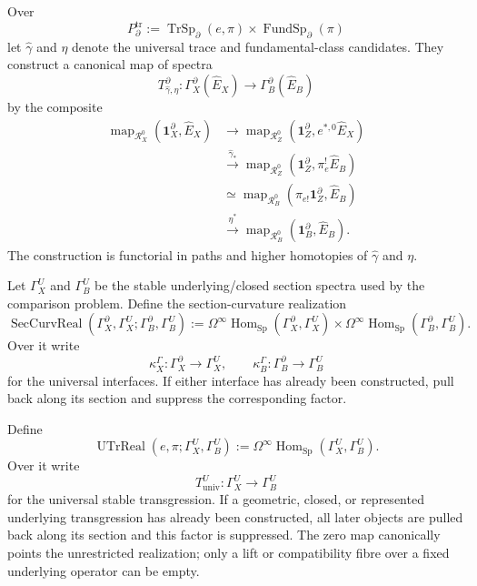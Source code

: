 \begin{construction}
\label{constr:prequantum-differential-transgression-operator}
Over
\[
P_{\partial}^{\mathrm{tr}}
:=
\operatorname{TrSp}_{\partial}(e,\pi)
\times
\operatorname{FundSp}_{\partial}(\pi)
\]
let $\widehat\gamma$ and $\eta$ denote the universal trace and
fundamental-class candidates.
They construct a canonical map of spectra
\[
\boxed{
T^{\partial}_{\widehat\gamma,\eta}:
\Gamma_X^{\partial}(\widehat E_X)
\longrightarrow
\Gamma_B^{\partial}(\widehat E_B)
}
\]
by the composite
\[
\begin{aligned}
\operatorname{map}_{\mathcal R_X^0}
(\mathbf1_X^{\partial},\widehat E_X)
&\longrightarrow
\operatorname{map}_{\mathcal R_Z^0}
(\mathbf1_Z^{\partial},e^{*,0}\widehat E_X)
\\
&\xrightarrow{\widehat\gamma_*}
\operatorname{map}_{\mathcal R_Z^0}
(\mathbf1_Z^{\partial},\pi_e^!\widehat E_B)
\\
&\simeq
\operatorname{map}_{\mathcal R_B^0}
(\pi_{e!}\mathbf1_Z^{\partial},\widehat E_B)
\\
&\xrightarrow{\eta^*}
\operatorname{map}_{\mathcal R_B^0}
(\mathbf1_B^{\partial},\widehat E_B).
\end{aligned}
\]
The construction is functorial in paths and higher homotopies of
$\widehat\gamma$ and $\eta$.
\end{construction}

Let $\Gamma_X^U$ and $\Gamma_B^U$ be the stable underlying/closed section spectra
used by the comparison problem.  Define the section-curvature realization
\[
\boxed{
\operatorname{SecCurvReal}(\Gamma_X^{\partial},\Gamma_X^U;
                            \Gamma_B^{\partial},\Gamma_B^U)
:=
\Omega^\infty\operatorname{Hom}_{\operatorname{Sp}}
(\Gamma_X^{\partial},\Gamma_X^U)
\times
\Omega^\infty\operatorname{Hom}_{\operatorname{Sp}}
(\Gamma_B^{\partial},\Gamma_B^U).
}
\]
Over it write
\[
\kappa_X^{\Gamma}:\Gamma_X^{\partial}\to\Gamma_X^U,
\qquad
\kappa_B^{\Gamma}:\Gamma_B^{\partial}\to\Gamma_B^U
\]
for the universal interfaces.  If either interface has already been constructed,
pull back along its section and suppress the corresponding factor.

\begin{definition}
\label{def:prequantum-underlying-transgression-realization}
Define
\[
\boxed{
\operatorname{UTrReal}(e,\pi;\Gamma_X^U,\Gamma_B^U)
:=
\Omega^\infty
\operatorname{Hom}_{\operatorname{Sp}}
(\Gamma_X^U,\Gamma_B^U).
}
\]
Over it write
\[
T^U_{\mathrm{univ}}:\Gamma_X^U\longrightarrow\Gamma_B^U
\]
for the universal stable transgression.  If a geometric, closed, or represented
underlying transgression has already been constructed, all later objects are
pulled back along its section and this factor is suppressed.
The zero map canonically points the unrestricted realization; only a lift or
compatibility fibre over a fixed underlying operator can be empty.
\end{definition}

